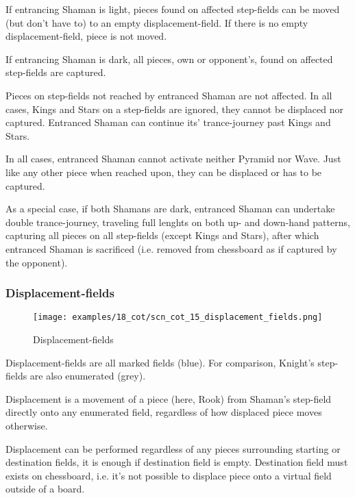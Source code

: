 If entrancing Shaman is light, pieces found on affected step-fields can be moved
(but don't have to) to an empty displacement-field. If there is no empty
displacement-field, piece is not moved.

If entrancing Shaman is dark, all pieces, own or opponent's, found on affected
step-fields are captured.

Pieces on step-fields not reached by entranced Shaman are not affected. In all
cases, Kings and Stars on a step-fields are ignored, they cannot be displaced
nor captured. Entranced Shaman can continue its' trance-journey past Kings and Stars.

In all cases, entranced Shaman cannot activate neither Pyramid nor Wave. Just like
any other piece when reached upon, they can be displaced or has to be captured.

As a special case, if both Shamans are dark, entranced Shaman can undertake double
trance-journey, traveling full lenghts on both up- and down-hand patterns, capturing
all pieces on all step-fields (except Kings and Stars), after which entranced Shaman
is sacrificed (i.e. removed from chessboard as if captured by the opponent).

\clearpage %

\subsubsection*{Displacement-fields}

\noindent
\begin{figure}[!h]
\texttt{[image: examples/18\_cot/scn\_cot\_15\_displacement\_fields.png]}
\caption{Displacement-fields}
\label{fig:scn_cot_15_displacement_fields}
\end{figure}

Displacement-fields are all marked fields (blue). For comparison, Knight's
step-fields are also enumerated (grey).

Displacement is a movement of a piece (here, Rook) from Shaman's step-field directly
onto any enumerated field, regardless of how displaced piece moves otherwise.

Displacement can be performed regardless of any pieces surrounding starting or
destination fields, it is enough if destination field is empty. Destination field
must exists on chessboard, i.e. it's not possible to displace piece onto a virtual
field outside of a board.

